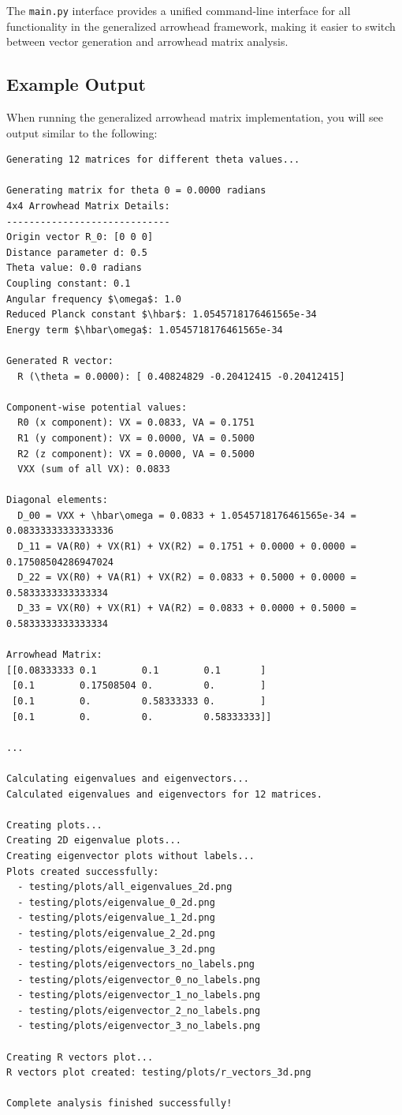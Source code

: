 The \texttt{main.py} interface provides a unified command-line interface for all functionality in the generalized arrowhead framework, making it easier to switch between vector generation and arrowhead matrix analysis.

\subsection{Example Output}

When running the generalized arrowhead matrix implementation, you will see output similar to the following:

\begin{verbatim}
Generating 12 matrices for different theta values...

Generating matrix for theta 0 = 0.0000 radians
4x4 Arrowhead Matrix Details:
-----------------------------
Origin vector R_0: [0 0 0]
Distance parameter d: 0.5
Theta value: 0.0 radians
Coupling constant: 0.1
Angular frequency $\omega$: 1.0
Reduced Planck constant $\hbar$: 1.0545718176461565e-34
Energy term $\hbar\omega$: 1.0545718176461565e-34

Generated R vector:
  R (\theta = 0.0000): [ 0.40824829 -0.20412415 -0.20412415]

Component-wise potential values:
  R0 (x component): VX = 0.0833, VA = 0.1751
  R1 (y component): VX = 0.0000, VA = 0.5000
  R2 (z component): VX = 0.0000, VA = 0.5000
  VXX (sum of all VX): 0.0833

Diagonal elements:
  D_00 = VXX + \hbar\omega = 0.0833 + 1.0545718176461565e-34 = 0.08333333333333336
  D_11 = VA(R0) + VX(R1) + VX(R2) = 0.1751 + 0.0000 + 0.0000 = 0.17508504286947024
  D_22 = VX(R0) + VA(R1) + VX(R2) = 0.0833 + 0.5000 + 0.0000 = 0.5833333333333334
  D_33 = VX(R0) + VX(R1) + VA(R2) = 0.0833 + 0.0000 + 0.5000 = 0.5833333333333334

Arrowhead Matrix:
[[0.08333333 0.1        0.1        0.1       ]
 [0.1        0.17508504 0.         0.        ]
 [0.1        0.         0.58333333 0.        ]
 [0.1        0.         0.         0.58333333]]

...

Calculating eigenvalues and eigenvectors...
Calculated eigenvalues and eigenvectors for 12 matrices.

Creating plots...
Creating 2D eigenvalue plots...
Creating eigenvector plots without labels...
Plots created successfully:
  - testing/plots/all_eigenvalues_2d.png
  - testing/plots/eigenvalue_0_2d.png
  - testing/plots/eigenvalue_1_2d.png
  - testing/plots/eigenvalue_2_2d.png
  - testing/plots/eigenvalue_3_2d.png
  - testing/plots/eigenvectors_no_labels.png
  - testing/plots/eigenvector_0_no_labels.png
  - testing/plots/eigenvector_1_no_labels.png
  - testing/plots/eigenvector_2_no_labels.png
  - testing/plots/eigenvector_3_no_labels.png

Creating R vectors plot...
R vectors plot created: testing/plots/r_vectors_3d.png

Complete analysis finished successfully!
\end{verbatim}


